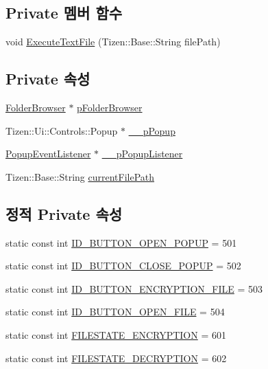 \subsection*{Private 멤버 함수}
\begin{DoxyCompactItemize}
\item 
void \hyperlink{class_list_view_item_popup_a56169532269cb6c8e3cd61ddd6e605ce}{Execute\+Text\+File} (Tizen\+::\+Base\+::\+String file\+Path)
\end{DoxyCompactItemize}
\subsection*{Private 속성}
\begin{DoxyCompactItemize}
\item 
\hyperlink{class_folder_browser}{Folder\+Browser} $\ast$ \hyperlink{class_list_view_item_popup_a33b5bebeb60329746d785d2b721748b0}{p\+Folder\+Browser}
\item 
Tizen\+::\+Ui\+::\+Controls\+::\+Popup $\ast$ \hyperlink{class_list_view_item_popup_ae2763988a34f0ecbfb81aeb3cc2ca59a}{\+\_\+\+\_\+p\+Popup}
\item 
\hyperlink{class_popup_event_listener}{Popup\+Event\+Listener} $\ast$ \hyperlink{class_list_view_item_popup_a42979e0b89cd38da4f6046e678d21437}{\+\_\+\+\_\+p\+Popup\+Listener}
\item 
Tizen\+::\+Base\+::\+String \hyperlink{class_list_view_item_popup_a395472f1d8380e5d2d9e18e80a90c3a7}{current\+File\+Path}
\end{DoxyCompactItemize}
\subsection*{정적 Private 속성}
\begin{DoxyCompactItemize}
\item 
static const int \hyperlink{class_list_view_item_popup_a039ba26046cd62bd44d24d60fa0cc2f6}{I\+D\+\_\+\+B\+U\+T\+T\+O\+N\+\_\+\+O\+P\+E\+N\+\_\+\+P\+O\+P\+U\+P} = 501
\item 
static const int \hyperlink{class_list_view_item_popup_a5a64693bdce3cd6333f7973aa69f54f9}{I\+D\+\_\+\+B\+U\+T\+T\+O\+N\+\_\+\+C\+L\+O\+S\+E\+\_\+\+P\+O\+P\+U\+P} = 502
\item 
static const int \hyperlink{class_list_view_item_popup_a61acb07d5c6a128502350c9a309eb171}{I\+D\+\_\+\+B\+U\+T\+T\+O\+N\+\_\+\+E\+N\+C\+R\+Y\+P\+T\+I\+O\+N\+\_\+\+F\+I\+L\+E} = 503
\item 
static const int \hyperlink{class_list_view_item_popup_a01416363f91fad984fb0543c48a0d5ea}{I\+D\+\_\+\+B\+U\+T\+T\+O\+N\+\_\+\+O\+P\+E\+N\+\_\+\+F\+I\+L\+E} = 504
\item 
static const int \hyperlink{class_list_view_item_popup_ab455af4bb5e9b8c13572ac0e06b05cff}{F\+I\+L\+E\+S\+T\+A\+T\+E\+\_\+\+E\+N\+C\+R\+Y\+P\+T\+I\+O\+N} = 601
\item 
static const int \hyperlink{class_list_view_item_popup_a8f4af33ad25eb4228734b49c521d052c}{F\+I\+L\+E\+S\+T\+A\+T\+E\+\_\+\+D\+E\+C\+R\+Y\+P\+T\+I\+O\+N} = 602
\end{DoxyCompactItemize}


